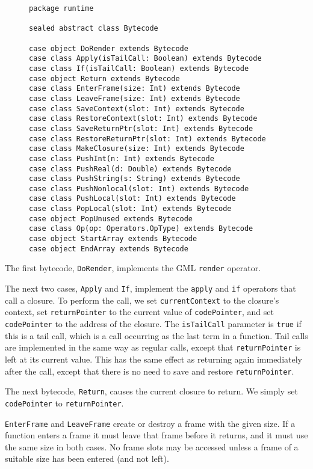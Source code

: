 \begin{figure}
\begin{verbatim}
package runtime

sealed abstract class Bytecode

case object DoRender extends Bytecode
case class Apply(isTailCall: Boolean) extends Bytecode
case class If(isTailCall: Boolean) extends Bytecode
case object Return extends Bytecode
case class EnterFrame(size: Int) extends Bytecode
case class LeaveFrame(size: Int) extends Bytecode
case class SaveContext(slot: Int) extends Bytecode
case class RestoreContext(slot: Int) extends Bytecode
case class SaveReturnPtr(slot: Int) extends Bytecode
case class RestoreReturnPtr(slot: Int) extends Bytecode
case class MakeClosure(size: Int) extends Bytecode
case class PushInt(n: Int) extends Bytecode
case class PushReal(d: Double) extends Bytecode
case class PushString(s: String) extends Bytecode
case class PushNonlocal(slot: Int) extends Bytecode
case class PushLocal(slot: Int) extends Bytecode
case class PopLocal(slot: Int) extends Bytecode
case object PopUnused extends Bytecode
case class Op(op: Operators.OpType) extends Bytecode
case object StartArray extends Bytecode
case object EndArray extends Bytecode
\end{verbatim}
\getcaption
\end{figure}

The first bytecode, \verb!DoRender!,
implements the GML \verb!render! operator.

The next two cases, \verb!Apply! and \verb!If!,
implement the \verb!apply! and \verb!if! operators that call a closure.
To perform the call,
we set \verb!currentContext! to the closure's context,
set \verb!returnPointer! to the current value of \verb!codePointer!,
and set \verb!codePointer! to the address of the closure.
The \verb!isTailCall! parameter is \verb!true! if this is a tail call,
which is a call occurring as the last term in a function.
Tail calls are implemented in the same way as regular calls,
except that \verb!returnPointer! is left at its current value.
This has the same effect as returning again immediately after the call,
except that there is no need to save and restore \verb!returnPointer!.

The next bytecode, \verb!Return!, causes the current closure to return.
We simply set \verb!codePointer! to \verb!returnPointer!.

\verb!EnterFrame! and \verb!LeaveFrame! create or destroy a frame
with the given size.
If a function enters a frame it must leave that frame before it returns,
and it must use the same size in both cases.
No frame slots may be accessed
unless a frame of a suitable size has been entered (and not left).

